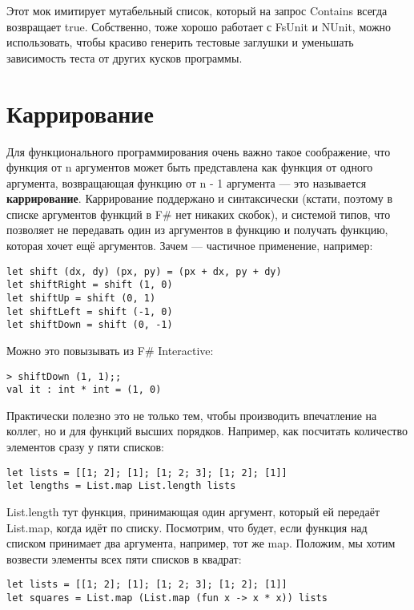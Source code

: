 \documentclass{../../text-style}
\begin{document}
Этот мок имитирует мутабельный список, который на запрос Contains всегда возвращает true. Собственно, тоже хорошо работает с FsUnit и NUnit, можно использовать, чтобы красиво генерить тестовые заглушки и уменьшать зависимость теста от других кусков программы.


\section{Каррирование}

Для функционального программирования очень важно такое соображение, что функция от n аргументов может быть представлена как функция от одного аргумента, возвращающая функцию от n - 1 аргумента --- это называется \textbf{каррирование}. Каррирование поддержано и синтаксически (кстати, поэтому в списке аргументов функций в F\# нет никаких скобок), и системой типов, что позволяет не передавать один из аргументов в функцию и получать функцию, которая хочет ещё аргументов. Зачем --- частичное применение, например:

\begin{verbatim}
let shift (dx, dy) (px, py) = (px + dx, py + dy)
let shiftRight = shift (1, 0)
let shiftUp = shift (0, 1)
let shiftLeft = shift (-1, 0)
let shiftDown = shift (0, -1)
\end{verbatim}

Можно это повызывать из F\# Interactive:

\begin{verbatim}
> shiftDown (1, 1);;
val it : int * int = (1, 0)
\end{verbatim}

Практически полезно это не только тем, чтобы производить впечатление на коллег, но и для функций высших порядков. Например, как посчитать количество элементов сразу у пяти списков:

\begin{verbatim}
let lists = [[1; 2]; [1]; [1; 2; 3]; [1; 2]; [1]]
let lengths = List.map List.length lists
\end{verbatim}

List.length тут функция, принимающая один аргумент, который ей передаёт List.map, когда идёт по списку. Посмотрим, что будет, если функция над списком принимает два аргумента, например, тот же map. Положим, мы хотим возвести элементы всех пяти списков в квадрат:

\begin{verbatim}
let lists = [[1; 2]; [1]; [1; 2; 3]; [1; 2]; [1]]
let squares = List.map (List.map (fun x -> x * x)) lists
\end{verbatim}
\end{document}
